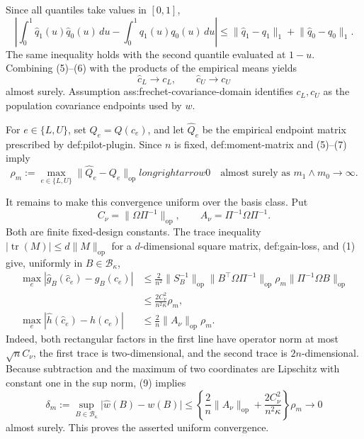 Since all quantiles take values in \([0,1]\),
\[
 \left\lvert
  \int_0^1\widehat q_1(u)\widehat q_0(u)\,du
  -\int_0^1q_1(u)q_0(u)\,du
 \right\rvert
 \le
 \lVert\widehat q_1-q_1\rVert_1+
 \lVert\widehat q_0-q_0\rVert_1.
 \tag{6}
\]
The same inequality holds with the second quantile evaluated at \(1-u\).  Combining (5)--(6) with the products of the empirical means yields
\[
 \widehat c_L\to c_L,
 \qquad
 \widehat c_U\to c_U
 \tag{7}
\]
almost surely.  Assumption ass:frechet-covariance-domain identifies \(c_L,c_U\) as the population covariance endpoints used by \(w\).

For \(e\in\{L,U\}\), set \(Q_e=Q(c_e)\), and let \(\widehat Q_e\) be the empirical endpoint matrix prescribed by def:pilot-plugin.  Since \(n\) is fixed, def:moment-matrix and (5)--(7) imply
\[
 \rho_m:=\max_{e\in\{L,U\}}
 \lVert\widehat Q_e-Q_e\rVert_{\mathrm{op}}longrightarrow0
 \quad\text{almost surely as }m_1\wedge m_0\to\infty.
 \tag{8}
\]

It remains to make this convergence uniform over the basis class.  Put
\[
 C_\nu=\lVert\Omega\Pi^{-1}\rVert_{\mathrm{op}},
 \qquad
 A_\nu=\Pi^{-1}\Omega\Pi^{-1}.
\]
Both are finite fixed-design constants.  The trace inequality
\(\lvert\operatorname{tr}(M)\rvert\le d\lVert M\rVert_{\mathrm{op}}\) for a \(d\)-dimensional square matrix, def:gain-loss, and (1) give, uniformly in \(B\in\mathcal B_\kappa\),
\[
\begin{aligned}
 \max_e\left\lvert
  \widehat g_B(\widehat c_e)-g_B(c_e)
 \right\rvert
 &\le
 \frac{2}{n^2}\lVert S_B^{-1}\rVert_{\mathrm{op}}
 \lVert B^{\top}\Omega\Pi^{-1}\rVert_{\mathrm{op}}
 \rho_m
 \lVert\Pi^{-1}\Omega B\rVert_{\mathrm{op}} \\
 &\le \frac{2C_\nu^2}{n^2\kappa}\rho_m,
 \\
 \max_e\left\lvert
  \widehat h(\widehat c_e)-h(c_e)
 \right\rvert
 &\le \frac{2}{n}\lVert A_\nu\rVert_{\mathrm{op}}\rho_m.
\end{aligned}
\tag{9}
\]
Indeed, both rectangular factors in the first line have operator norm at most \(\sqrt n C_\nu\), the first trace is two-dimensional, and the second trace is \(2n\)-dimensional.  Because subtraction and the maximum of two coordinates are Lipschitz with constant one in the sup norm, (9) implies
\[
 \delta_m:=\sup_{B\in\mathcal B_\kappa}
 \lvert\widehat w(B)-w(B)\rvert
 \le
 \left\{\frac{2}{n}\lVert A_\nu\rVert_{\mathrm{op}}
       +\frac{2C_\nu^2}{n^2\kappa}\right\}\rho_m
 \longrightarrow0
 \tag{10}
\]
almost surely.  This proves the asserted uniform convergence.

